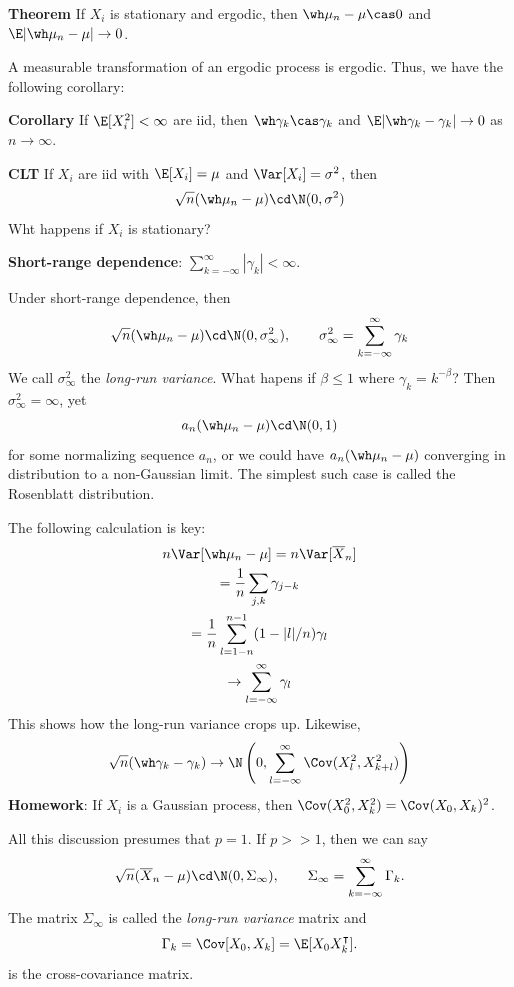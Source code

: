 \textbf{Theorem} If \(X_i\) is stationary and ergodic, then \(\wh \mu_n - \mu \cas 0\) and \(\E |\wh \mu_n - \mu| \to 0\).

A measurable transformation of an ergodic process is ergodic. Thus, we have the following corollary:

\textbf{Corollary} If \(\E[X_i^2] < \infty\) are iid, then \(\wh \gamma_k \cas \gamma_k\) and \(\E | \wh\gamma_k - \gamma_k | \to 0\) as \(n \to \infty\).

\textbf{CLT} If \(X_i\) are iid with \(\E[X_i] = \mu\) and \(\Var[X_i] = \sigma^2\), then
\[\sqrt{n}(\wh\mu_n - \mu) \cd \N(0, \sigma^2)\]
Wht happens if \(X_i\) is stationary?

\textbf{Short-range dependence}: \(\sum_{k=-\infty}^\infty |\gamma_k| < \infty\).

Under short-range dependence, then
\[\sqrt{n}(\wh \mu_n - \mu) \cd \N(0, \sigma^2_\infty), \qquad \sigma^2_\infty = \sum_{k=-\infty}^\infty \gamma_k\]
We call \(\sigma^2_\infty\) the \emph{long-run variance}. What hapens if \(\beta \leq 1\) where \(\gamma_k = k^{-\beta}\)? Then \(\sigma^2_\infty = \infty\), yet
\[a_n(\wh \mu_n - \mu) \cd \N(0, 1)\]
for some normalizing sequence \(a_n\), or we could have \(a_n(\wh\mu_n - \mu)\) converging in distribution to a non-Gaussian limit. The simplest such case is called the Rosenblatt distribution.

The following calculation is key:
\[\begin{gathered}n \Var[\wh \mu_n - \mu] = n \Var[\overline X_n] \\
= \frac{1}{n}\sum_{j,k} \gamma_{j-k} \\
= \frac{1}{n}\sum_{l=1-n}^{n-1}(1 - |l|/n)\gamma_l \\
\to \sum_{l=-\infty}^\infty \gamma_l\end{gathered}\]
This shows how the long-run variance crops up. Likewise,
\[\sqrt{n}(\wh\gamma_k - \gamma_k) \to \N\left( 0, \sum_{l=-\infty}^\infty \Cov(X_l^2, X_{k+l}^2) \right)\]
\textbf{Homework}: If \(X_i\) is a Gaussian process, then \(\Cov(X_0^2, X_k^2) = \Cov(X_0, X_k)^2\).

All this discussion presumes that \(p = 1\). If \(p >> 1\), then we can say
\[\sqrt{n}(\overline{X}_n - \mu) \cd \N(0, \Sigma_\infty), \qquad \Sigma_\infty = \sum_{k=-\infty}^\infty \Gamma_k.\]
The matrix \(\Sigma_\infty\) is called the \emph{long-run variance} matrix and
\[\Gamma_k = \Cov[X_0, X_k] = \E[X_0 X_k^\intercal].\]
is the cross-covariance matrix.
